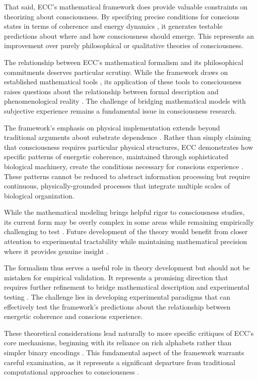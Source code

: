 That said, ECC's mathematical framework does provide valuable constraints on theorizing about consciousness. By specifying precise conditions for conscious states in terms of coherence and energy dynamics \cite{merleau2012phenomenology}, it generates testable predictions about where and how consciousness should emerge. This represents an improvement over purely philosophical or qualitative theories of consciousness.

The relationship between ECC's mathematical formalism and its philosophical commitments deserves particular scrutiny. While the framework draws on established mathematical tools \cite{pigliucci2013philosophy}, its application of these tools to consciousness raises questions about the relationship between formal description and phenomenological reality \cite{block2009comparing}. The challenge of bridging mathematical models with subjective experience remains a fundamental issue in consciousness research.

The framework's emphasis on physical implementation extends beyond traditional arguments about substrate dependence \cite{noe2009out}. Rather than simply claiming that consciousness requires particular physical structures, ECC demonstrates how specific patterns of energetic coherence, maintained through sophisticated biological machinery, create the conditions necessary for conscious experience \cite{koch2019feeling}. These patterns cannot be reduced to abstract information processing but require continuous, physically-grounded processes that integrate multiple scales of biological organization.

While the mathematical modeling brings helpful rigor to consciousness studies, its current form may be overly complex in some areas while remaining empirically challenging to test \cite{chalmers2010character}. Future development of the theory would benefit from closer attention to experimental tractability while maintaining mathematical precision where it provides genuine insight \cite{seth2021being}.

The formalism thus serves a useful role in theory development but should not be mistaken for empirical validation. It represents a promising direction that requires further refinement to bridge mathematical description and experimental testing \cite{goff2019galileo}. The challenge lies in developing experimental paradigms that can effectively test the framework's predictions about the relationship between energetic coherence and conscious experience.

These theoretical considerations lead naturally to more specific critiques of ECC's core mechanisms, beginning with its reliance on rich alphabets rather than simpler binary encodings \cite{thompson2014waking}. This fundamental aspect of the framework warrants careful examination, as it represents a significant departure from traditional computational approaches to consciousness \cite{dennett2017bacteria}.

